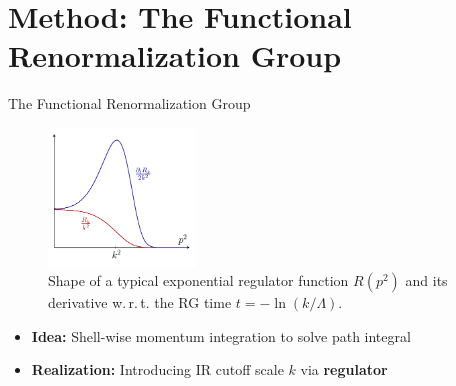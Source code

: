 \documentclass{beamer}
\begin{document}
\section{Method: The Functional Renormalization Group}

\begin{frame}{The Functional Renormalization Group}
\begin{figure}[t]
\centering
\includegraphics[width=0.35\textwidth]{figures/regulator_plot}
\caption{Shape of a typical exponential regulator function $R(p^2)$ and its\\ \hspace{1.4cm} derivative w.\,r.\,t. the RG time $t = -\ln (k/\Lambda)$.}
\vspace{-0.3cm}
\hrulefill	
\end{figure}
\vspace{-0.3cm}
	\begin{itemize}
		\item \textbf{Idea:} Shell-wise momentum integration to solve path integral\vspace{0.2cm}
		\item  \textbf{Realization:} Introducing IR cutoff scale $k$ via \textbf{regulator}
	\end{itemize}
\end{frame}
\end{document}
